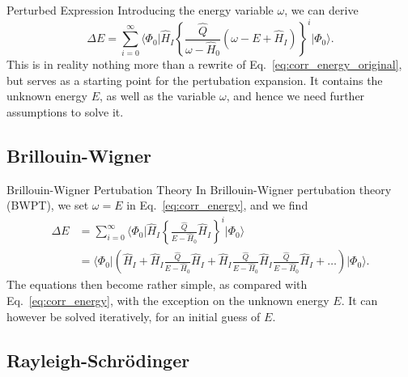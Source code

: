\documentclass[UKenglish,aspectratio=169]{beamer}
\begin{document}
\begin{frame}{Perturbed Expression}
    Introducing the energy variable $\omega$, we can derive
    \begin{equation}\label{eq:corr_energy}
        \Delta E = \sum_{i = 0}^\infty \Big\langle \Phi_0 \big\vert \hat{H}_I \left\{
            \frac{\hat{Q}}{\omega - \hat{H}_0} \left( \omega - E + \hat{H}_I \right)
        \right\}^{i} \big\lvert \Phi_0 \Big\rangle.
    \end{equation}
    This is in reality nothing more than a rewrite of Eq.~\eqref{eq:corr_energy_original}, but serves as a starting point for the pertubation expansion.
    It contains the unknown energy $E$, as well as the variable $\omega$, and hence we need further assumptions to solve it.
\end{frame}

\subsection{Brillouin-Wigner}

\begin{frame}{Brillouin-Wigner Pertubation Theory}
    In Brillouin-Wigner pertubation theory (BWPT), we set $\omega = E$ in Eq.~\eqref{eq:corr_energy}, and we find
    \begin{equation}
        \begin{split}
            \Delta E &= \sum_{i = 0}^\infty \Big\langle \Phi_0 \big\vert \hat{H}_I \left\{
                \frac{\hat{Q}}{E - \hat{H}_0} \hat{H}_I
            \right\}^{i} \big\lvert \Phi_0 \Big\rangle \\
            &= \Big\langle \Phi_0 \vert \left( \hat{H}_I + \hat{H}_I \frac{\hat{Q}}{E - \hat{H}_0} \hat{H}_I + \hat{H}_I \frac{\hat{Q}}{E - \hat{H}_0} \hat{H}_I \frac{\hat{Q}}{E - \hat{H}_0} \hat{H}_I + \ldots \right) \big\lvert \Phi_0 \Big\rangle.
        \end{split}
    \end{equation}
    The equations then become rather simple, as compared with Eq.~\eqref{eq:corr_energy}, with the exception on the unknown energy $E$.
    It can however be solved iteratively, for an initial guess of $E$.
\end{frame}

\subsection{Rayleigh-Schrödinger}
\end{document}
